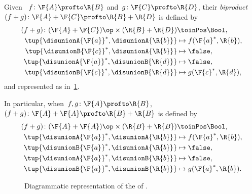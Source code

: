 \begin{definition}
    \label{def:biproduct-dp}
    Given ~$f\colon \F{A} \profto \R{B}$ and~$g\colon \F{C} \profto \R{D}$, their \emph{biproduct}~$(f + g)\colon \F{A} + \F{C} \profto \R{B} + \R{D}$ is defined by
    \begin{equation}
        \begin{aligned}
            (f + g)
            \colon (\F{A} + \F{C})\op  \times (\R{B} + \R{D}) & \toinPos \Bool, \\
            \tup{\disunionA{\F{a}}^*, \disunionA{\R{b}}}      & \mapsto f(\F{a}^*, \R{b}), \\
            \tup{\disunionB{\F{c}}^*, \disunionA{\R{b}}}      & \mapsto \false, \\
            \tup{\disunionA{\F{a}}^*, \disunionB{\R{d}}}      & \mapsto \false, \\
            \tup{\disunionB{\F{c}}^*, \disunionB{\R{d}}}      & \mapsto g(\F{c}^*, \R{d}),
        \end{aligned}
    \end{equation}
    and represented as in~\cref{fig:biproductdp}.

    In particular, when~$f, g\colon \F{A} \profto \R{B}$,~$(f + g)\colon \F{A} + \F{A} \profto \R{B} + \R{B}$ is defined by
    \begin{equation}
        \begin{aligned}
            (f + g)
            \colon (\F{A} + \F{A})\op  \times (\R{B} + \R{B}) & \toinPos \Bool, \\
            \tup{\disunionA{\F{a}}^*, \disunionA{\R{b}}}      & \mapsto f(\F{a}^*, \R{b}), \\
            \tup{\disunionB{ \F{a}}^*, \disunionA{\R{b}}}     & \mapsto \false, \\
            \tup{\disunionA{\F{a}}^*, \disunionB{ \R{b}}}     & \mapsto \false, \\
            \tup{\disunionB{ \F{a}}^*, \disunionB{ \R{b}}}    & \mapsto g(\F{a}^*, \R{b}).
        \end{aligned}
    \end{equation}
\end{definition}

\begin{figure}[h!]
    \begin{center}
    \end{center}
    \caption{Diagrammatic representation of the  of . }
    \label{fig:biproductdp}
\end{figure}

